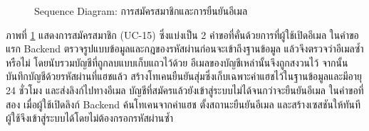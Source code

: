 \begin{figure}[H]
\centering
{}
\caption{Sequence Diagram: การสมัครสมาชิกและการยืนยันอีเมล}
\label{fig:sequence_signup}
\end{figure}

ภาพที่ \ref{fig:sequence_signup} แสดงการสมัครสมาชิก (UC-15) ซึ่งแบ่งเป็น 2 คำขอที่คั่นด้วยการที่ผู้ใช้เปิดอีเมล ในคำขอแรก Backend ตรวจรูปแบบข้อมูลและกฎของรหัสผ่านก่อนจะเข้าถึงฐานข้อมูล แล้วจึงตรวจว่าอีเมลซ้ำหรือไม่ โดยนับรวมบัญชีที่ถูกลบแบบเก็บแถวไว้ด้วย อีเมลของบัญชีเหล่านั้นจึงถูกสงวนไว้ จากนั้นบันทึกบัญชีด้วยรหัสผ่านที่แฮชแล้ว สร้างโทเคนยืนยันสุ่มซึ่งเก็บเฉพาะค่าแฮชไว้ในฐานข้อมูลและมีอายุ 24 ชั่วโมง และส่งลิงก์ไปทางอีเมล บัญชีที่สมัครแล้วยังเข้าสู่ระบบไม่ได้จนกว่าจะยืนยันอีเมล ในคำขอที่สอง เมื่อผู้ใช้เปิดลิงก์ Backend ค้นโทเคนจากค่าแฮช ตั้งสถานะยืนยันอีเมล และสร้างเซสชันให้ทันที ผู้ใช้จึงเข้าสู่ระบบได้โดยไม่ต้องกรอกรหัสผ่านซ้ำ

